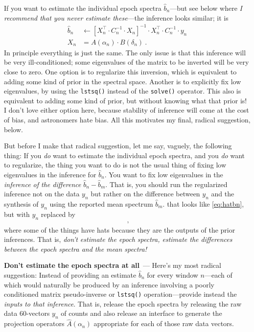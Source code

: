 \documentclass[11pt]{article}
\renewcommand{\paragraph}[1]{\medskip\par\noindent\textbf{#1}~---}
\begin{document}
If you want to estimate the individual epoch spectra $\hat{b}_n$---but see below where \emph{I recommend that you never estimate these}---the inference looks similar; it is
\begin{align}
  \hat{b}_n &\leftarrow [X_n^\top\cdot C_n^{-1}\cdot X_n]^{-1}\cdot X_n^\top\cdot C_n^{-1}\cdot y_n\label{eq:hatbn}\\
  X_n &= A(\alpha_n)\cdot B(\delta_n)~.
\end{align}
In principle everything is just the same.
The only issue is that this inference will be very ill-conditioned; some eigenvalues of the matrix to be inverted will be very close to zero.
One option is to regularize this inversion, which is equivalent to adding some kind of prior in the spectral space.
Another is to explicitly fix low eigenvalues, by using the \texttt{lstsq()} instead of the \texttt{solve()} operator.
This also is equivalent to adding some kind of prior, but without knowing what that prior is!
I don't love either option here, because stability of inference will come at the cost of bias, and astronomers hate bias.
All this motivates my final, radical suggestion, below.

But before I make that radical suggestion, let me say, vaguely, the following thing:
If you \emph{do} want to estimate the individual epoch spectra, and you \emph{do} want to regularize, the thing you want to do is not the usual thing of fixing low eigenvalues in the inference for $\hat{b}_n$.
You want to fix low eigenvalues in the \emph{inference of the difference} $\hat{b}_n - \hat{b}_m$.
That is, you should run the regularized inference not on the data $y_n$ but rather on the difference between $y_n$ and the synthesis of $y_n$ using the reported mean spectrum $\hat{b}_m$.
that looks like \eqref{eq:hatbn}, but with $y_n$ replaced by
\begin{align}
    [y_n - \hat{A}(\alpha_n)\cdot B(\delta_n)\cdot \hat{b}_m] ~,
\end{align}
where some of the things have hats because they are the outputs of the prior inferences.
That is, \emph{don't estimate the epoch spectra, estimate the differences between the epoch spectra and the mean spectra!}

\paragraph{Don't estimate the epoch spectra at all}
Here's my most radical suggestion: Instead of providing an estimate $\hat{b}_n$ for every window $n$---each of which would naturally be produced by an inference involving a poorly conditioned matrix pseudo-inverse or \texttt{lstsq()} operation---provide instead the \emph{inputs to that inference}.
That is, release the epoch spectra by releasing the raw data 60-vectors $y_n$ of counts and also release an interface to generate the projection operators $\hat{A}(\alpha_n)$ appropriate for each of those raw data vectors.
\end{document}
